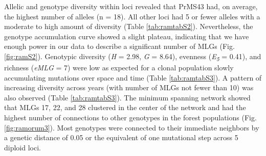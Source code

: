 \documentclass[double,12pt]{beavtex}
\begin{document}
  Allelic and genotype diversity within loci revealed that PrMS43 had, on
  average, the highest number of alleles (n = 18). All other loci had 5 or
  fewer alleles with a moderate to high amount of diversity (Table
  \ref{tab:ramtabS2}). Nevertheless, the genotype accumulation curve
  showed a slight plateau, indicating that we have enough power in our
  data to describe a significant number of MLGs (Fig. \ref{fig:ramS2}).
  Genotypic diversity (\emph{H} = 2.98, \emph{G} = 8.64), evenness
  (\emph{E\textsubscript{5}} = 0.41), and richness (\emph{eMLG} = 7) were
  low as expected for a clonal population slowly accumulating mutations
  over space and time (Table \ref{tab:ramtabS3}). A pattern of increasing
  diversity across years (with number of MLGs not fewer than 10) was also
  observed (Table \ref{tab:ramtabS3}). The minimum spanning network showed
  that MLGs 17, 22, and 28 clustered in the center of the network and had
  the highest number of connections to other genotypes in the forest
  populations (Fig. \ref{fig:ramorum3}). Most genotypes were connected to
  their immediate neighbors by a genetic distance of 0.05 or the
  equivalent of one mutational step across 5 diploid loci.
  
\end{document}
